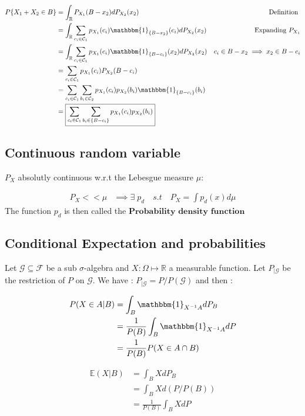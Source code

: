 \begin{itemize}
\begin{align*}
P\{X_1+X_2 \in B\} &= \int_{\mathbb{R}} P_{X_1}(B-x_2) dP_{X_2}(x_2) \quad &\text{Definition }\\
&=\int_{\mathbb{R}} \sum_{c_i \in \mathcal{C}_1} p_{X_1}(c_i)\mathbbm{1}_{\{B-x_2\}}(c_i) dP_{X_2}(x_2) &\text{Expanding $P_{X_1}$} \\
&=\int_{\mathbb{R}} \sum_{c_i \in \mathcal{C}_1} p_{X_1}(c_i)\mathbbm{1}_{\{B-c_i\}}(x_2) dP_{X_2}(x_2) &\text{$c_i \in B-x_2 \implies x_2 \in B-c_i$}\\
&=\sum_{c_i \in \mathcal{C}_1} p_{X_1}(c_i)P_{X_2}(B-c_i) \\
&=\sum_{c_i \in \mathcal{C}_1}\sum_{b_i \in \mathcal{C}_2} p_{X_1}(c_i) p_{X_2}(b_i)\mathbbm{1}_{\{B-c_i\}}(b_i) \\
&=\boxed{\displaystyle\sum_{c_i \in \mathcal{C}_1}\sum_{b_i \in \{B - c_i\}}p_{X_1}(c_i) p_{X_2}(b_i)}
\end{align*}


\end{itemize}


\subsection*{Continuous random variable}
$P_X$ absolutly continuous w.r.t the Lebesgue measure $\mu$:

\begin{align}
P_X << \mu &\implies \exists \; p_d \quad s.t \quad P_X = \int p_d(x)d\mu
\end{align}
The function $p_d$ is then called the $\textbf{Probability density function}$



\newpage
\subsection*{Conditional Expectation and probabilities}
Let $\mathcal{G} \subseteq \mathcal{F}$ be a sub $\sigma$-algebra and $X:\Omega \longmapsto \mathbb{R}$ a measurable function. Let $P_{|\mathcal{G}}$ be the restriction of $P$ on $\mathcal{G}$. We have : $P_{|\mathcal{G}} = P/P(\mathcal{G})$ and then :

\begin{align*}
    P(X\in A | B)   &= \int_B \mathbbm{1}_{X^{-1}A}dP_B \\
		    &= \frac{1}{P(B)}\int_B \mathbbm{1}_{X^{-1}A}dP \\
		    &= \frac{1}{P(B)} P(X\in A \cap B)
\end{align*}

\begin{align*}
    \mathbb{E}(X | B)	&= \int_B XdP_B \\
			&= \int_B Xd(P/P(B)) \\
			&= \frac{1}{P(B)} \int_B XdP 
\end{align*}


